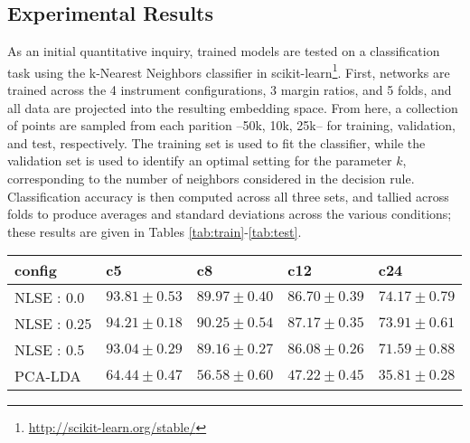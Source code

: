 \subsection{Experimental Results}

As an initial quantitative inquiry, trained models are tested on a classification task using the k-Nearest Neighbors classifier in scikit-learn\footnote{\url{http://scikit-learn.org/stable/}}.
First, networks are trained across the 4 instrument configurations, 3 margin ratios, and 5 folds, and all data are projected into the resulting embedding space.
From here, a collection of points are sampled from each parition --50k, 10k, 25k-- for training, validation, and test, respectively.
The training set is used to fit the classifier, while the validation set is used to identify an optimal setting for the parameter $k$, corresponding to the number of neighbors considered in the decision rule.
Classification accuracy is then computed across all three sets, and tallied across folds to produce averages and standard deviations across the various conditions; these results are given in Tables \ref{tab:train}-\ref{tab:test}.


\begin{table*}[h!]
\begin{center}
\caption{kNN classification results over the training set.}
\small
\begin{tabular}{lllll}
 config  & c5    & c8   & c12  & c24  \\
\hline
 NLSE : 0.0  & $93.81\pm0.53$ & $89.97\pm0.40$ & $86.70\pm0.39$ & $74.17\pm0.79$ \\
 NLSE : 0.25 & $94.21\pm0.18$ & $90.25\pm0.54$ & $87.17\pm0.35$ & $73.91\pm0.61$ \\
 NLSE : 0.5  & $93.04\pm0.29$ & $89.16\pm0.27$ & $86.08\pm0.26$ & $71.59\pm0.88$ \\
 \hline
 PCA-LDA & $64.44\pm0.47$ & $56.58\pm0.60$ & $47.22\pm0.45$ & $35.81\pm0.28$ \\

\hline
\end{tabular}
\label{tab:train}
\end{center}
\end{table*}

